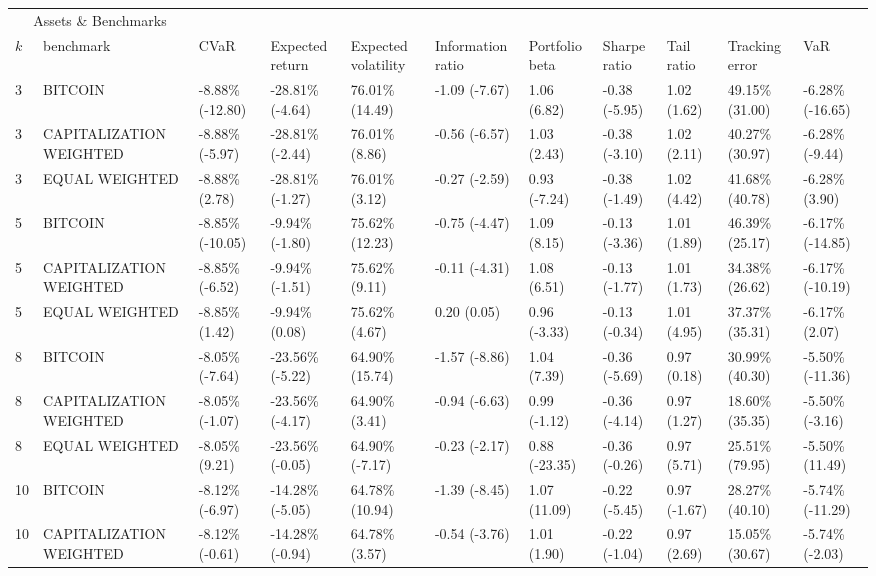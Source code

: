 \documentclass{article}
\begin{document}
\begin{landscape}
\begin{table}[H]
  \centering
  \begin{tabular}{p{0.4cm}|p{3cm}|p{1.65cm}|p{1.65cm}|p{1.65cm}|p{1.65cm}|p{1.65cm}|p{1.65cm}|p{1.65cm}|p{1.65cm}|p{1.65cm}}%
    \toprule
    \multicolumn{2}{c}{Assets \& Benchmarks}                   \\
    \cmidrule(r){1-2}
    $k$ & benchmark & CVaR & Expected return & Expected volatility&Information ratio&Portfolio beta&Sharpe ratio&Tail ratio&Tracking error&VaR\\
    \midrule
    3&BITCOIN&-8.88\% (-12.80)&-28.81\% (-4.64)&76.01\% (14.49)&-1.09 (-7.67)&1.06 (6.82)&-0.38 (-5.95)&1.02 (1.62)&49.15\% (31.00)&-6.28\% (-16.65)
\\ 
3&CAPITALIZATION WEIGHTED&-8.88\% (-5.97)&-28.81\% (-2.44)&76.01\% (8.86)&-0.56 (-6.57)&1.03 (2.43)&-0.38 (-3.10)&1.02 (2.11)&40.27\% (30.97)&-6.28\% (-9.44)
\\ 
3&EQUAL WEIGHTED&-8.88\% (2.78)&-28.81\% (-1.27)&76.01\% (3.12)&-0.27 (-2.59)&0.93 (-7.24)&-0.38 (-1.49)&1.02 (4.42)&41.68\% (40.78)&-6.28\% (3.90)
\\ 
5&BITCOIN&-8.85\% (-10.05)&-9.94\% (-1.80)&75.62\% (12.23)&-0.75 (-4.47)&1.09 (8.15)&-0.13 (-3.36)&1.01 (1.89)&46.39\% (25.17)&-6.17\% (-14.85)
\\ 
5&CAPITALIZATION WEIGHTED&-8.85\% (-6.52)&-9.94\% (-1.51)&75.62\% (9.11)&-0.11 (-4.31)&1.08 (6.51)&-0.13 (-1.77)&1.01 (1.73)&34.38\% (26.62)&-6.17\% (-10.19)
\\ 
5&EQUAL WEIGHTED&-8.85\% (1.42)&-9.94\% (0.08)&75.62\% (4.67)&0.20 (0.05)&0.96 (-3.33)&-0.13 (-0.34)&1.01 (4.95)&37.37\% (35.31)&-6.17\% (2.07)
\\ 
8&BITCOIN&-8.05\% (-7.64)&-23.56\% (-5.22)&64.90\% (15.74)&-1.57 (-8.86)&1.04 (7.39)&-0.36 (-5.69)&0.97 (0.18)&30.99\% (40.30)&-5.50\% (-11.36)
\\ 
8&CAPITALIZATION WEIGHTED&-8.05\% (-1.07)&-23.56\% (-4.17)&64.90\% (3.41)&-0.94 (-6.63)&0.99 (-1.12)&-0.36 (-4.14)&0.97 (1.27)&18.60\% (35.35)&-5.50\% (-3.16)
\\ 
8&EQUAL WEIGHTED&-8.05\% (9.21)&-23.56\% (-0.05)&64.90\% (-7.17)&-0.23 (-2.17)&0.88 (-23.35)&-0.36 (-0.26)&0.97 (5.71)&25.51\% (79.95)&-5.50\% (11.49)
\\ 
10&BITCOIN&-8.12\% (-6.97)&-14.28\% (-5.05)&64.78\% (10.94)&-1.39 (-8.45)&1.07 (11.09)&-0.22 (-5.45)&0.97 (-1.67)&28.27\% (40.10)&-5.74\% (-11.29)
\\ 
10&CAPITALIZATION WEIGHTED&-8.12\% (-0.61)&-14.28\% (-0.94)&64.78\% (3.57)&-0.54 (-3.76)&1.01 (1.90)&-0.22 (-1.04)&0.97 (2.69)&15.05\% (30.67)&-5.74\% (-2.03)

\end{tabular}
\end{table}
\end{landscape}
\end{document}
